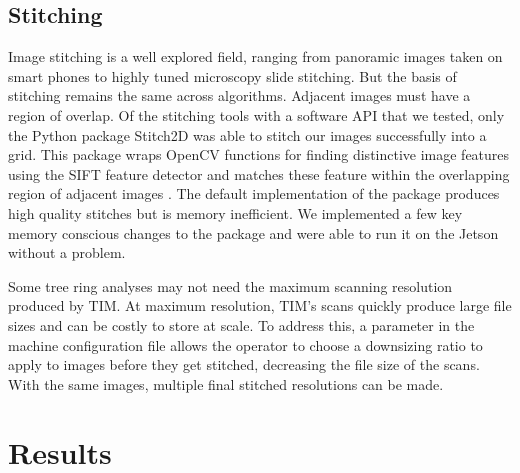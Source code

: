 \documentclass[a4paper,12pt]{article}
\begin{document}
\subsection{Stitching}

Image stitching is a well explored field, ranging from panoramic images taken on smart phones to highly tuned microscopy slide stitching. 
But the basis of stitching remains the same across algorithms. Adjacent images must have a region of overlap. 
Of the stitching tools with a software API that we tested, only the Python package Stitch2D was able to stitch our images successfully into a grid. %
This package wraps OpenCV functions for finding distinctive image features using the SIFT feature detector and matches these feature within the overlapping region of adjacent images \citep{lowe_distinctive_2004}. 
The default implementation of the package produces high quality stitches but is memory inefficient. %
We implemented a few key memory conscious changes to the package and were able to run it on the Jetson without a problem. 

Some tree ring analyses may not need the maximum scanning resolution produced by TIM. At maximum resolution, TIM's scans quickly produce large file sizes and can be costly to store at scale. 
To address this, a parameter in the machine configuration file allows the operator to choose a downsizing ratio to apply to images before they get stitched, decreasing the file size of the scans.
With the same images, multiple final stitched resolutions can be made. 

\section{Results}
\end{document}
